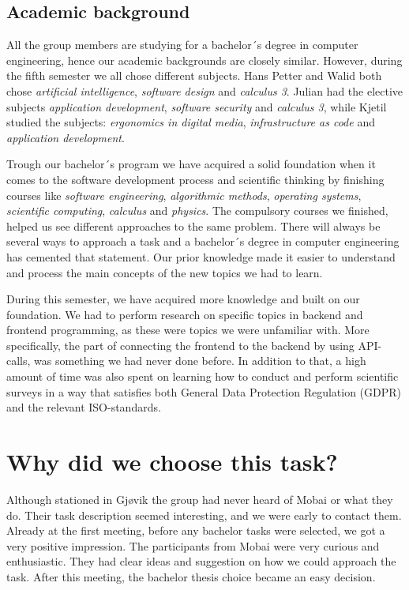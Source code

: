 \subsection{Academic background}
\label{section:academic background}
All the group members are studying for a bachelor´s degree in computer engineering, hence our academic backgrounds are closely similar. However, during the fifth semester we all chose different subjects. Hans Petter and Walid both chose \textit{artificial intelligence}, \textit{software design} and \textit{calculus 3}. Julian had the elective subjects \textit{application development}, \textit{software security} and \textit{calculus 3}, while Kjetil studied the subjects: \textit{ergonomics in digital media}, \textit{infrastructure as code} and \textit{application development}. 

Trough our bachelor´s program we have acquired a solid foundation when it comes to the software development process and scientific thinking by finishing courses like \textit{software engineering}, \textit{algorithmic methods}, \textit{operating systems}, \textit{scientific computing}, \textit{calculus} and \textit{physics}. The compulsory courses we finished, helped us see different approaches to the same problem. There will always be several ways to approach a task and a bachelor´s degree in computer engineering has cemented that statement. Our prior knowledge made it easier to understand and process the main concepts of the new topics we had to learn. 

During this semester, we have acquired more knowledge and built on our foundation. We had to perform research on specific topics in backend and frontend programming, as these were topics we were unfamiliar with. More specifically, the part of connecting the frontend to the backend by using API-calls, was something we had never done before. In addition to that, a high amount of time was also spent on learning how to conduct and perform scientific surveys in a way that satisfies both General Data Protection Regulation (GDPR) and the relevant ISO-standards.  

\section{Why did we choose this task?}
Although stationed in Gjøvik the group had never heard of Mobai or what they do. Their task description seemed interesting, and we were early to contact them. Already at the first meeting, before any bachelor tasks were selected, we got a very positive impression. The participants from Mobai were very curious and enthusiastic. They had clear ideas and suggestion on how we could approach the task. After this meeting, the bachelor thesis choice became an easy decision. 

